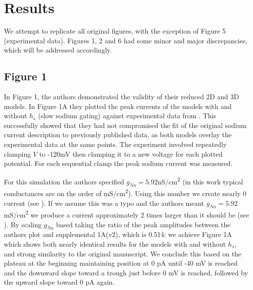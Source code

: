 \section{Results}

We attempt to replicate all original figures, with the exception of Figure 5 (experimental data). Figures 1, 2 and 6 had some minor and major discrepancies, which will be addressed accordingly.

\subsection{Figure 1}
In Figure 1, the authors demonstrated the validity of their reduced 2D and 3D models. In Figure 1A they plotted the peak currents of the models with and without $h_s$ (slow sodium gating) against experimental data from \cite{Seutin2010}. This successfully showed that they had not compromised the fit of the original sodium current description to previously published data, as both models overlay the experimental data at the same points. The experiment involved repeatedly clamping $V$ to -120mV then clamping it to a new voltage for each plotted potential. For each sequential clamp the peak sodium current was measured.

For this simulation the authors specified $g_{Na}=5.92$nS/cm\textsuperscript{2} (in this work typical conductances are on the order of mS/cm\textsuperscript{2}). Using this number we create nearly 0 current (see ). If we assume this was a typo and the authors meant $g_{Na}=5.92$ mS/cm\textsuperscript{2} we produce a current approximately 2 times larger than it should be (see ). By scaling $g_{Na}$ based taking the ratio of the peak amplitudes between the authors plot and supplemental 1A(v2), which is 0.514: we achieve Figure 1A which shows both nearly identical results for the models with and without $h_s$, and strong similarity to the original manuscript. We conclude this based on the plateau at the beginning maintaining position at 0 pA until -40 mV is reached and the downward slope toward a trough just before 0 mV is reached, followed by the upward slope toward 0 pA again. 

